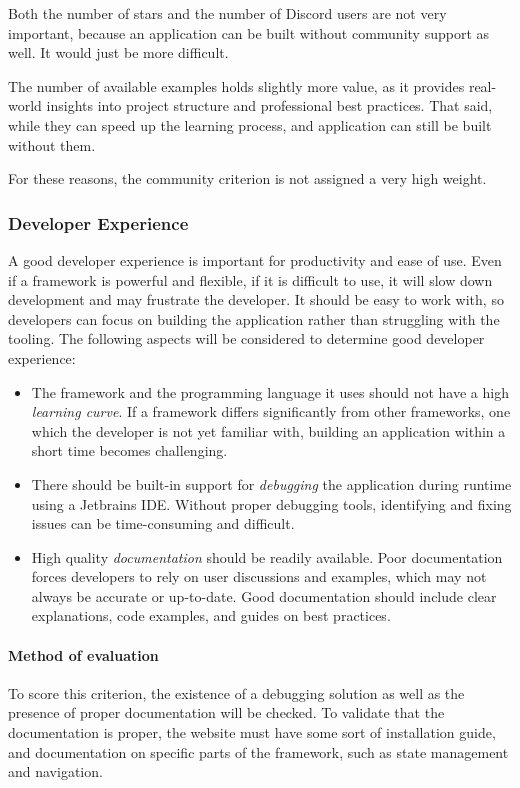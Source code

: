 Both the number of stars and the number of Discord users are not very important, because an application can be built without community support as well.
It would just be more difficult.

The number of available examples holds slightly more value, as it provides real-world insights into project structure and professional best practices.
That said, while they can speed up the learning process, and application can still be built without them.

For these reasons, the community criterion is not assigned a very high weight.

\subsubsection{Developer Experience}\label{subsubsec:developer-experience}
A good developer experience is important for productivity and ease of use.
Even if a framework is powerful and flexible, if it is difficult to use, it will slow down development and may frustrate the developer.
It should be easy to work with, so developers can focus on building the application rather than struggling with the tooling.
The following aspects will be considered to determine good developer experience:

\begin{itemize}
	\item The framework and the programming language it uses should not have a high \emph{learning curve}.
	      If a framework differs significantly from other frameworks, one which the developer is not yet familiar with, building an application within a short time becomes challenging.
	\item There should be built-in support for \emph{debugging} the application during runtime using a Jetbrains IDE.
	      Without proper debugging tools, identifying and fixing issues can be time-consuming and difficult.
	\item High quality \emph{documentation} should be readily available.
	      Poor documentation forces developers to rely on user discussions and examples, which may not always be accurate or up-to-date.
	      Good documentation should include clear explanations, code examples, and guides on best practices.
\end{itemize}

\paragraph{Method of evaluation}
To score this criterion, the existence of a debugging solution as well as the presence of proper documentation will be checked.
To validate that the documentation is proper, the website must have some sort of installation guide, and documentation on specific parts of the framework, such as state management and navigation.

